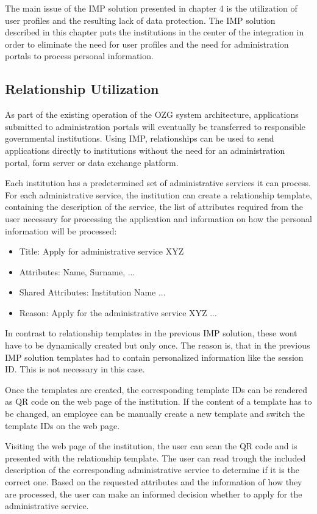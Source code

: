 The main issue of the IMP solution presented in chapter 4 is the utilization of user profiles and the resulting lack of data protection. The IMP solution described in this chapter puts the institutions in the center of the integration in order to eliminate the need for user profiles and the need for administration portals to process personal information.

\subsection{Relationship Utilization}

As part of the existing operation of the OZG system architecture, applications submitted to administration portals will eventually be transferred to responsible governmental institutions. Using IMP, relationships can be used to send applications directly to institutions without the need for an administration portal, form server or data exchange platform.

Each institution has a predetermined set of administrative services it can process. For each administrative service, the institution can create a relationship template, containing the description of the service, the list of attributes required from the user necessary for processing the application and information on how the personal information will be processed:

\begin{itemize}
    \item Title: Apply for administrative service XYZ
    \item Attributes: Name, Surname, ... 
    \item Shared Attributes: Institution Name ...
    \item Reason: Apply for the administrative service XYZ ...
\end{itemize}

In contrast to relationship templates in the previous IMP solution, these wont have to be dynamically created but only once. The reason is, that in the previous IMP solution templates had to contain personalized information like the session ID. This is not necessary in this case.

Once the templates are created, the corresponding template IDs can be rendered as QR code on the web page of the institution. If the content of a template has to be changed, an employee can be manually create a new template and switch the template IDs on the web page.

Visiting the web page of the institution, the user can scan the QR code and is presented with the relationship template. The user can read trough the included description of the corresponding administrative service to determine if it is the correct one. Based on the requested attributes and the information of how they are processed, the user can make an informed decision whether to apply for the administrative service.

